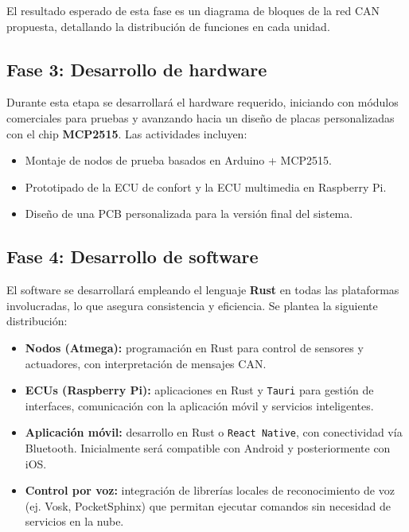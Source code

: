 El resultado esperado de esta fase es un diagrama de bloques de la red CAN propuesta, detallando la distribución de funciones en cada unidad.

\subsection{Fase 3: Desarrollo de hardware}

Durante esta etapa se desarrollará el hardware requerido, iniciando con módulos comerciales para pruebas y avanzando hacia un diseño de placas personalizadas con el chip \textbf{MCP2515}. Las actividades incluyen:

\begin{itemize}
    \item Montaje de nodos de prueba basados en Arduino + MCP2515.
    \item Prototipado de la ECU de confort y la ECU multimedia en Raspberry Pi.
    \item Diseño de una PCB personalizada para la versión final del sistema.
\end{itemize}

\subsection{Fase 4: Desarrollo de software}

El software se desarrollará empleando el lenguaje \textbf{Rust} en todas las plataformas involucradas, lo que asegura consistencia y eficiencia. Se plantea la siguiente distribución:

\begin{itemize}
    \item \textbf{Nodos (Atmega):} programación en Rust para control de sensores y actuadores, con interpretación de mensajes CAN.
    \item \textbf{ECUs (Raspberry Pi):} aplicaciones en Rust y \texttt{Tauri} para gestión de interfaces, comunicación con la aplicación móvil y servicios inteligentes.
    \item \textbf{Aplicación móvil:} desarrollo en Rust o \texttt{React Native}, con conectividad vía Bluetooth. Inicialmente será compatible con Android y posteriormente con iOS.
    \item \textbf{Control por voz:} integración de librerías locales de reconocimiento de voz (ej. Vosk, PocketSphinx) que permitan ejecutar comandos sin necesidad de servicios en la nube.
\end{itemize}

